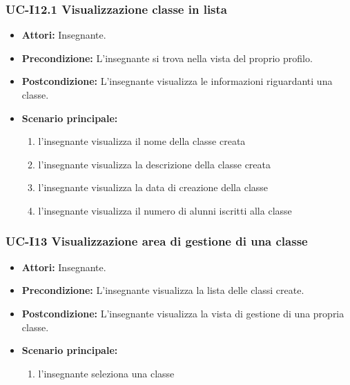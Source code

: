 \subsubsection{UC-I12.1 Visualizzazione classe in lista}		
\begin{itemize}
	\item \textbf{Attori:} Insegnante.
	\item \textbf{Precondizione:} L'insegnante si trova nella vista del proprio profilo.
	\item \textbf{Postcondizione:} L'insegnante visualizza le informazioni riguardanti una classe.
	\item \textbf{Scenario principale:}
	\begin{enumerate}
		\item l'insegnante visualizza il nome della classe creata
		\item l'insegnante visualizza la descrizione della classe creata
		\item l'insegnante visualizza la data di creazione della classe
		\item l'insegnante visualizza il numero di alunni iscritti alla classe
	\end{enumerate}		
\end{itemize}

\subsubsection{UC-I13 Visualizzazione area di gestione di una classe}
\begin{itemize}
	\item \textbf{Attori:} Insegnante.
	\item \textbf{Precondizione:} L'insegnante visualizza la lista delle classi create.
	\item \textbf{Postcondizione:} L'insegnante visualizza la vista di gestione di una propria classe.
	\item \textbf{Scenario principale:}
	\begin{enumerate}
		\item l'insegnante seleziona una classe
	\end{enumerate}
\end{itemize}

